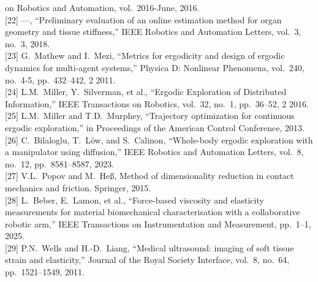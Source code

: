 \documentclass[11pt]{article}
\begin{document}
\begin{footnotesize}
on Robotics and Automation, vol.~2016-June, 2016.\\[2pt]
[22] ---, ``Preliminary evaluation of an online estimation method
for organ geometry and tissue stiffness,'' IEEE Robotics and
Automation Letters, vol.~3, no.~3, 2018.\\[2pt]
[23] G.~Mathew and I.~Mezi, ``Metrics for ergodicity and design of
ergodic dynamics for multi-agent systems,'' Physica D: Nonlinear
Phenomena, vol.~240, no.~4-5, pp.~432--442, 2 2011.\\[2pt]
[24] L.M.~Miller, Y.~Silverman, et al., ``Ergodic Exploration of
Distributed Information,'' IEEE Transactions on Robotics, vol.~32,
no.~1, pp.~36--52, 2 2016.\\[2pt]
[25] L.M.~Miller and T.D.~Murphey, ``Trajectory optimization for
continuous ergodic exploration,'' in Proceedings of the American
Control Conference, 2013.\\[2pt]
[26] C.~Bilaloglu, T.~L\"ow, and S.~Calinon, ``Whole-body ergodic
exploration with a manipulator using diffusion,'' IEEE Robotics and
Automation Letters, vol.~8, no.~12, pp.~8581--8587, 2023.\\[2pt]
[27] V.L.~Popov and M.~He\ss, Method of dimensionality reduction in
contact mechanics and friction. Springer, 2015.\\[2pt]
[28] L.~Beber, E.~Lamon, et al., ``Force-based viscosity and
elasticity measurements for material biomechanical characterisation
with a collaborative robotic arm,'' IEEE Transactions on
Instrumentation and Measurement, pp.~1--1, 2025.\\[2pt]
[29] P.N.~Wells and H.-D.~Liang, ``Medical ultrasound: imaging of
soft tissue strain and elasticity,'' Journal of the Royal Society
Interface, vol.~8, no.~64, pp.~1521--1549, 2011.
\end{footnotesize}
\end{document}
